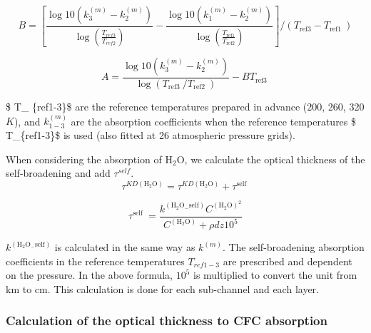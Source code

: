 \begin{equation}
B=\left[\frac{\log 10\left(k_{3}^{(m)}-k_{2}^{(m)}\right)}{\log \left(\frac{T_{r e f 3}}{T_{r e f 2}}\right)}-\frac{\log 10\left(k_{1}^{(m)}-k_{2}^{(m)}\right)}{\log \left(\frac{T_{\text {ref1} }}{T_{\text {ref2}}}\right)}\right] /\left(T_{\text {ref3}}-T_{\text {ref1 }}\right)
\end{equation}

\begin{equation}
A=\frac{\log 10\left(k_{3}^{(m)}-k_{2}^{(m)}\right)}{\log \left(T_{\text {ref3 } } / T_{\text {ref2 } }\right)}-B T_{\text {ref3 }}
\end{equation}

\$ T\_ \{ref1-3\}\$ are the reference temperatures prepared in advance
(200, 260, 320 \(K\)), and \(k_{1-3}^{(m)}\) are the absorption
coefficients when the reference temperatures \$ T\_\{ref1-3\}\$ is used
(also fitted at 26 atmospheric pressure grids).

When considering the absorption of \(\mathrm{H}_{2} \mathrm{O}\), we
calculate the optical thickness of the self-broadening and add
\(\tau^{self}\). \begin{equation}
\tau^{K D\left(\mathrm{H}_{2} \mathrm{O}\right)}=\tau^{K D\left(\mathrm{H}_{2} \mathrm{O}\right)}+\tau^{\text {self }}
\end{equation}

\begin{equation}
\tau^{\text {self }}=\frac{k^{\left(\mathrm{H}_{2} \mathrm{O}_{-} \mathrm{self}\right)} C^{\left(\mathrm{H}_{2} \mathrm{O}\right)^{2}}}{C^{\left(\mathrm{H}_{2} \mathrm{O}\right)}+\rho d z 10^{5}}
\end{equation}

\(k^{(\mathrm{H}_{2} \mathrm{O}_{-} \mathrm{self})}\) is calculated in
the same way as \(k^{(m)}\). The self-broadening absorption coefficients
in the reference temperatures \(T_{ref1-3}\) are prescribed and
dependent on the pressure. In the above formula, \(10^{5}\) is
multiplied to convert the unit from \(\mathrm{km}\) to \(\mathrm{cm}\).
This calculation is done for each sub-channel and each layer.

\hypertarget{calculation-of-the-optical-thickness-to-cfc-absorption}{%
\subsubsection{Calculation of the optical thickness to CFC
absorption}\label{calculation-of-the-optical-thickness-to-cfc-absorption}}

